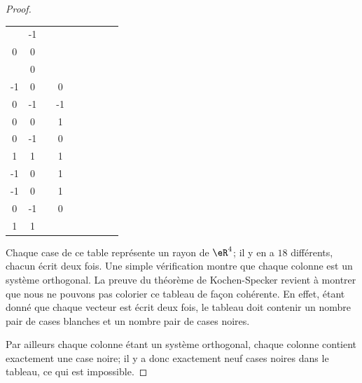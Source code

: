 \begin{proof}
\begin{tabular}{c|c|c|c|c|c|c|c|c}
\begin{matrix}
			   1 & -1 \\
			   0 & 0
		   \end{matrix}\) \\
		\hline
		\( \begin{matrix}
			   1  & 0 \\
			   -1 & 0
		   \end{matrix}\)
		 &
		\( \begin{matrix}
			   1 & 0  \\
			   0 & -1
		   \end{matrix}\)
		 &
		\( \begin{matrix}
			   1 & -1 \\
			   0 & 0
		   \end{matrix}\)
		 &
		\( \begin{matrix}
			   0 & 1  \\
			   0 & -1
		   \end{matrix}\)
		 &
		\( \begin{matrix}
			   0 & 0 \\
			   1 & 1
		   \end{matrix}\)
		 &
		\( \begin{matrix}
			   0  & 1 \\
			   -1 & 0
		   \end{matrix}\)
		 &
		\( \begin{matrix}
			   0  & 1 \\
			   -1 & 0
		   \end{matrix}\)
		 &
		\( \begin{matrix}
			   0 & 1  \\
			   0 & -1
		   \end{matrix}\)
		 &
		\( \begin{matrix}
			   0 & 0 \\
			   1 & 1
		   \end{matrix}\) \\
		\hline
	\end{tabular}

	Chaque case de ce table représente un rayon de \( \eR^4\); il y en a \( 18\) différents, chacun écrit deux fois. Une simple vérification montre que chaque colonne est un système orthogonal. La preuve du théorème de Kochen-Specker revient à montrer que nous ne pouvons pas colorier ce tableau de façon cohérente. En effet, étant donné que chaque vecteur est écrit deux fois, le tableau doit contenir un nombre pair de cases blanches et un nombre pair de cases noires.

	Par ailleurs chaque colonne étant un système orthogonal, chaque colonne contient exactement une case noire; il y a donc exactement neuf cases noires dans le tableau, ce qui est impossible.

\end{proof}

